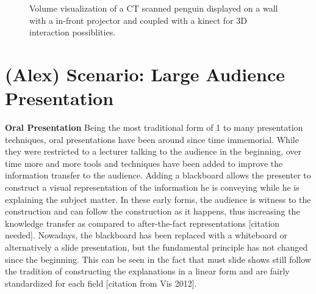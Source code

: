 \documentclass[review,journal]{vgtc}         %
\begin{document}
\begin{figure}[htb]
	\centering
	\caption{Volume visualization of a CT scanned penguin displayed on a wall with a in-front projector and coupled with a kinect for 3D interaction possiblities.}
	\label{img:exhibition_kinect}
\end{figure}

\section{(Alex) Scenario: Large Audience Presentation}

\noindent \textbf{Oral Presentation} Being the most traditional form of 1 to many presentation techniques, oral presentations have been around since time immemorial.
While they were restricted to a lecturer talking to the audience in the beginning, over time more and more tools and techniques have been added to improve the information transfer to the audience.
Adding a blackboard allows the presenter to construct a visual representation of the information he is conveying while he is explaining the subject matter.
In these early forms, the audience is witness to the construction and can follow the construction as it happens, thus increasing the knowledge transfer as compared to after-the-fact representations [citation needed].
Nowadays, the blackboard has been replaced with a whiteboard or alternatively a slide presentation, but the fundamental principle has not changed since the beginning.
This can be seen in the fact that must slide shows still follow the tradition of constructing the explanations in a linear form and are fairly standardized for each field [citation from Vis 2012].
\end{document}
